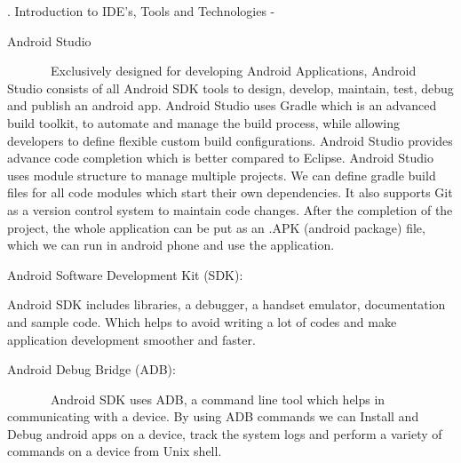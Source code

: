 \documentclass[12pt]{report}
\renewcommand{\_}{\kern-1.5pt\textunderscore\kern-1.5pt}
\begin{document}
\begin{multicols}{2}
\begin{justify}
\end{justify}
\begin{justify}
{\fontsize{10pt}{12.0pt}. Introduction to IDE’s, Tools and Technologies - }
\end{justify}
\begin{justify}
{\fontsize{10pt}{12.0pt} Android Studio}
\end{justify}
\begin{justify}
{\fontsize{10pt}{12.0pt}\selectfont \ \ \ \ \ \ \  \tab Exclusively designed for developing Android Applications, Android Studio consists of all Android SDK tools to design, develop, maintain, test, debug and publish an android app. Android Studio uses Gradle which is an advanced build toolkit, to automate and manage the build process, while allowing developers to define flexible custom build configurations. Android Studio provides advance code completion which is better compared to Eclipse. Android Studio uses module structure to manage multiple projects. We can define gradle build files for all code modules which start their own dependencies. It also supports Git as a version control system to maintain code changes. After the completion of the project, the whole application can be put as an .APK (android package) file, which we can run in android phone and use the application.\par}
\end{justify}
\begin{justify}
{\fontsize{10pt}{12.0pt} Android Software Development Kit (SDK):}
\end{justify}
\begin{justify}
{\fontsize{10pt}{12.0pt}\selectfont Android SDK includes libraries, a debugger, a handset emulator, documentation and sample code. Which helps to avoid writing a lot of codes and make application development smoother and faster.\par}
\end{justify}
\begin{justify}
{\fontsize{10pt}{12.0pt} Android Debug Bridge (ADB):}
\end{justify}
\begin{justify}
{\fontsize{10pt}{12.0pt}\selectfont \ \ \ \ \ \ \  \tab Android SDK uses ADB, a command line tool which helps in communicating with a device. By using ADB commands we can Install and Debug android apps on a device, track the system logs and perform a variety of commands on a device from Unix shell.\par}

\end{justify}
\end{multicols}
\end{document}
